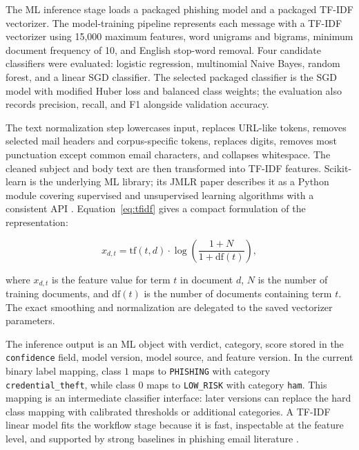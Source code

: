 \documentclass[12pt,a4paper]{article}
\begin{document}
The ML inference stage loads a packaged phishing model and a packaged TF-IDF vectorizer. The model-training pipeline represents each message with a TF-IDF vectorizer using 15,000 maximum features, word unigrams and bigrams, minimum document frequency of 10, and English stop-word removal. Four candidate classifiers were evaluated: logistic regression, multinomial Naive Bayes, random forest, and a linear SGD classifier. The selected packaged classifier is the SGD model with modified Huber loss and balanced class weights; the evaluation also records precision, recall, and F1 alongside validation accuracy.

The text normalization step lowercases input, replaces URL-like tokens, removes selected mail headers and corpus-specific tokens, replaces digits, removes most punctuation except common email characters, and collapses whitespace. The cleaned subject and body text are then transformed into TF-IDF features. Scikit-learn is the underlying ML library; its JMLR paper describes it as a Python module covering supervised and unsupervised learning algorithms with a consistent API \cite{pedregosa2011scikit}. Equation~\ref{eq:tfidf} gives a compact formulation of the representation:

\begin{equation}
x_{d,t} = \mathrm{tf}(t,d) \cdot \log\left(\frac{1 + N}{1 + \mathrm{df}(t)}\right),
\label{eq:tfidf}
\end{equation}

where \(x_{d,t}\) is the feature value for term \(t\) in document \(d\), \(N\) is the number of training documents, and \(\mathrm{df}(t)\) is the number of documents containing term \(t\). The exact smoothing and normalization are delegated to the saved vectorizer parameters.

The inference output is an ML object with verdict, category, score stored in the \texttt{confidence} field, model version, model source, and feature version. In the current binary label mapping, class \(1\) maps to \texttt{PHISHING} with category \texttt{credential\_theft}, while class \(0\) maps to \texttt{LOW\_RISK} with category \texttt{ham}. This mapping is an intermediate classifier interface: later versions can replace the hard class mapping with calibrated thresholds or additional categories. A TF-IDF linear model fits the workflow stage because it is fast, inspectable at the feature level, and supported by strong baselines in phishing email literature \cite{fette2007learning,altawil2024comparative}.
\end{document}
